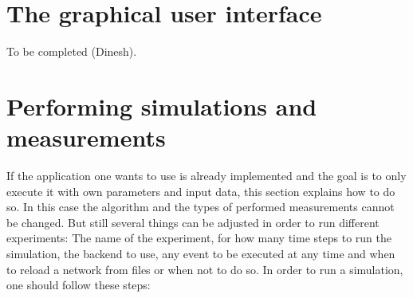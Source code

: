 \documentclass[11pt,fleqn]{book} %
\begin{document}
\section{The graphical user interface}
To be completed (Dinesh).

\section{Performing simulations and measurements}\label{sec:Simulation_Measurements}
If the application one wants to use is already implemented and the goal is to only execute it with own parameters and input data, this section explains how to do so. In this case the algorithm and the types of performed measurements cannot be changed. But still several things can be adjusted in order to run different experiments: The name of the experiment, for how many time steps to run the simulation, the backend to use, any event to be executed at any time and when to reload a network from files or when not to do so. In order to run a simulation, one should follow these steps: 
\end{document}

